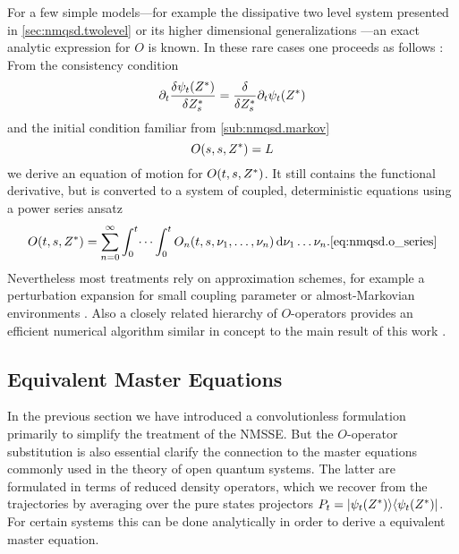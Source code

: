 For a few simple models---for example the dissipative two level system presented in \autoref{sec:nmqsd.twolevel} or its higher dimensional generalizations \cite{JiZhYo12_exact_nmqsd}---an exact analytic expression for $O$ is known.
In these rare cases one proceeds as follows \cite{DiGiSt98_nmqsd}:
From the consistency condition
\begin{equation}
  \partial_t \frac{\delta \psi_t({Z}^*)}{\delta {Z}^*_s} = \frac{\delta}{\delta {Z}^*_s} \partial_t \psi_t({Z}^*)
  \label{eq:nmqsd.consistency_condition}
\end{equation}
and the initial condition familiar from \autoref{sub:nmqsd.markov}
\begin{equation}
  O(s, s, {Z}^*) = L
  \label{eq:nmqsd.o_initial}
\end{equation}
we derive an equation of motion for $O(t, s, {Z}^*)$.
It still contains the functional derivative, but is converted to a system of coupled, deterministic equations using a power series ansatz
\begin{equation}
  O(t, s, \ZZ) = \sum_{n=0}^\infty \int_0^t \dots \int_0^t O_n(t, s, \nu_1, \dots, \nu_n) \dd \nu_1 \dots \nu_n.
  \autoref{eq:nmqsd.o_series}
\end{equation}
Nevertheless most treatments rely on approximation schemes, for example a perturbation expansion for small coupling parameter or almost-Markovian environments \cite{YuDiGiSt99_pertubation}.
Also a closely related hierarchy of $O$-operators provides an efficient numerical algorithm similar in concept to the main result of this work \cite{}.

\subsection{Equivalent Master Equations}
\label{sub:nmqsd.lin_nmsse.master}

In the previous section we have introduced a convolutionless formulation primarily to simplify the treatment of the NMSSE\@.
But the $O$-operator substitution is also essential clarify the connection to the master equations commonly used in the theory of open quantum systems.
The latter are formulated in terms of reduced density operators, which we recover from the trajectories by averaging over the pure states projectors $P_t = | \psi_t({Z}^*) \rangle\langle \psi_t({Z}^*) |$.
For certain systems this can be done analytically in order to derive a equivalent master equation.

